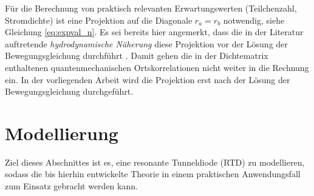 Für die Berechnung von praktisch relevanten Erwartungswerten (Teilchenzahl, Stromdichte) ist eine Projektion auf die Diagonale $r_a=r_b$ notwendig, siehe Gleichung \eqref{eq:expval_n}. Es sei bereits hier angemerkt, dass die in der Literatur auftretende  \emph{hydrodynamische Näherung} diese Projektion vor der Lösung der Bewegungsgleichung durchführt \cite{wiedenhaus}. Damit gehen die in der Dichtematrix enthaltenen quantenmechanischen Ortskorrelationen nicht weiter in die Rechnung ein. In der vorliegenden Arbeit wird die Projektion erst nach der Lösung der Bewegungsgleichung durchgeführt.


\section{Modellierung}
\label{sec:modellierung}
Ziel dieses Abschnittes ist es, eine resonante Tunneldiode (RTD)  zu modellieren, sodass die bis hierhin entwickelte Theorie in einem praktischen Anwendungsfall zum Einsatz gebracht werden kann.

